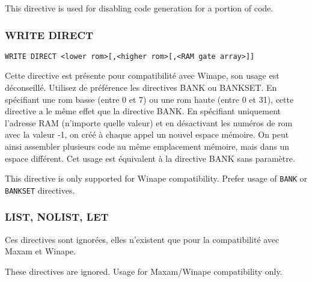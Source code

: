 \begin{xen}
This directive is used for disabling code generation for a portion of code. 
\end{xen}

\subsubsection{WRITE DIRECT}

\begin{verbatim}
WRITE DIRECT <lower rom>[,<higher rom>[,<RAM gate array>]]
\end{verbatim}

\begin{xfr}
Cette directive est présente pour compatibilité avec Winape, son usage est déconseillé. Utilisez de préférence les directives BANK ou BANKSET.
En spécifiant une rom basse (entre 0 et 7) ou une rom haute (entre 0 et 31), cette directive a le même effet que la directive BANK.
En spécifiant uniquement l'adresse RAM (n'importe quelle valeur) et en désactivant les numéros de rom avec la valeur -1, on créé à chaque appel un nouvel espace mémoire. On peut ainsi assembler plusieurs code au même emplacement mémoire, mais dans un espace différent. Cet usage est équivalent à la directive BANK sans paramètre.

\end{xfr}

\begin{xen}
This directive is only supported for Winape compatibility. Prefer usage of \texttt{BANK} or \texttt{BANKSET} directives.

\end{xen}


\subsubsection{LIST, NOLIST, LET}

\begin{xfr}
Ces directives sont ignorées, elles n'existent que pour la compatibilité avec Maxam et Winape.
\end{xfr}

\begin{xen}
These directives are ignored. Usage for Maxam/Winape compatibility only.
\end{xen}
